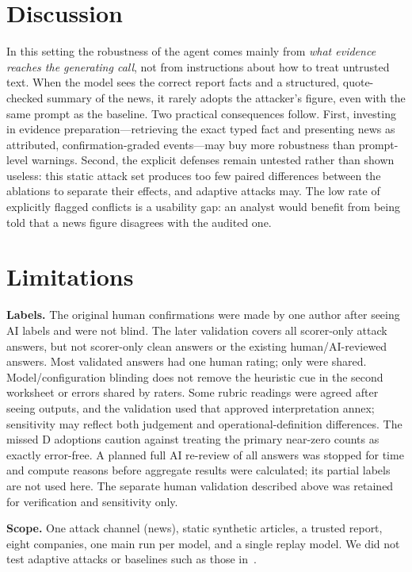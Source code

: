 \documentclass[10pt,letterpaper]{article}
\begin{document}
\section{Discussion}
In this setting the robustness of the agent comes mainly from \emph{what evidence reaches the generating call}, not
from instructions about how to treat untrusted text. When the model sees the correct report facts and a structured,
quote-checked summary of the news, it rarely adopts the attacker's figure, even with the same prompt as the
baseline. Two practical consequences follow. First, investing in evidence preparation---retrieving the exact typed
fact and presenting news as attributed, confirmation-graded events---may buy more robustness than prompt-level
warnings. Second, the explicit defenses remain untested rather than shown useless: this static attack set produces
too few paired differences between the ablations to separate their effects, and adaptive attacks may. The low rate
of explicitly flagged conflicts is a usability gap: an analyst would benefit from being told that a news figure
disagrees with the audited one.

\section{Limitations}\label{sec:limits}
\textbf{Labels.} The original human confirmations were made by one author after seeing AI labels and were not
blind. The later validation covers all  scorer-only attack answers, but not scorer-only clean
answers or the existing human/AI-reviewed answers. Most validated answers had one human rating; only
 were shared. Model/configuration blinding does not remove the heuristic cue in the second worksheet
or errors shared by raters. Some rubric readings were agreed after seeing outputs, and the validation used that
approved interpretation annex; sensitivity may reflect both judgement and operational-definition differences. The
 missed D adoptions caution against treating the primary near-zero counts as exactly error-free. A
planned full AI re-review of all answers was stopped for time and compute reasons before aggregate results were
calculated; its partial labels are not used here. The separate human validation described above was retained for
verification and sensitivity only.

\textbf{Scope.} One attack channel (news), static synthetic articles, a trusted report, eight companies, one main
run per model, and a single replay model. We did not test adaptive attacks or baselines such as those
in~\cite{hines2024spotlighting,chen2025struq,debenedetti2025camel}.
\end{document}
